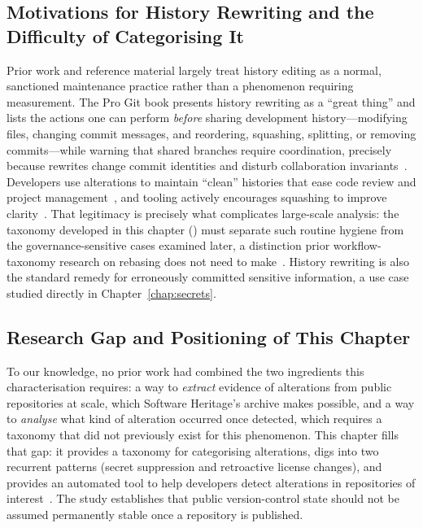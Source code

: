 \subsection{Motivations for History Rewriting and the Difficulty of Categorising It}
\label{subsec:hist-rw-rewriting}

Prior work and reference material largely treat history editing as a normal, sanctioned maintenance practice rather than a phenomenon requiring measurement.
The Pro Git book presents history rewriting as a ``great thing'' and lists the actions one can perform \emph{before} sharing development history---modifying files, changing commit messages, and reordering, squashing, splitting, or removing commits---while warning that shared branches require coordination, precisely because rewrites change commit identities and disturb collaboration invariants~\cite{ProGit2014}.
Developers use alterations to maintain ``clean'' histories that ease code review and project management~\cite{bird2009promisesmininggit, DBLP:conf/issre/JiCYM20}, and tooling actively encourages squashing to improve clarity~\cite{DBLP:conf/icse/GousiosPD14, DBLP:conf/scam/PaixaoM19, DBLP:journals/tvcg/KimKJKSKS21}.
That legitimacy is precisely what complicates large-scale analysis: the taxonomy developed in this chapter () must separate such routine hygiene from the governance-sensitive cases examined later, a distinction prior workflow-taxonomy research on rebasing does not need to make~\cite{DBLP:conf/scam/PaixaoM19, DBLP:journals/infsof/RiosEE22}.
History rewriting is also the standard remedy for erroneously committed sensitive information, a use case studied directly in Chapter~\ref{chap:secrets}.

\subsection{Research Gap and Positioning of This Chapter}
\label{subsec:hist-rw-positioning}

To our knowledge, no prior work had combined the two ingredients this characterisation requires: a way to \emph{extract} evidence of alterations from public repositories at scale, which Software Heritage's archive makes possible, and a way to \emph{analyse} what kind of alteration occurred once detected, which requires a taxonomy that did not previously exist for this phenomenon.
This chapter fills that gap: it provides a taxonomy for categorising alterations, digs into two recurrent patterns (secret suppression and retroactive license changes), and provides an automated tool to help developers detect alterations in repositories of interest~\cite{DBLP:conf/kbse/RapaportPTZ25,replication-package-altered-histories}.
The study establishes that public version-control state should not be assumed permanently stable once a repository is published.

